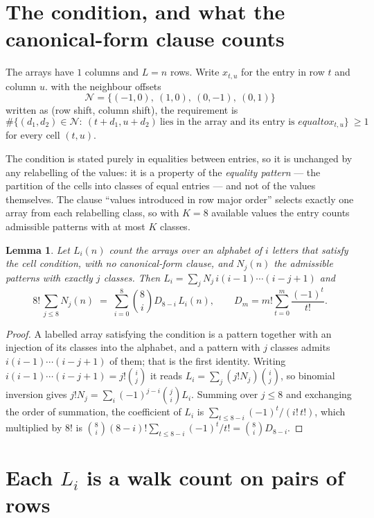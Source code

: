 \documentclass[11pt,a4paper]{article}
\theoremstyle{plain}
\newtheorem{lemma}[theorem]{Lemma}
\theoremstyle{definition}
\begin{document}
\section{The condition, and what the canonical-form clause counts}

The arrays have $1$ columns and $L=n$ rows. Write $x_{t,u}$ for the entry in
row $t$ and column $u$. with the neighbour offsets
\[
\mathcal N=\{(-1,0),\ (1,0),\ (0,-1),\ (0,1)\}
\]
written as (row shift, column shift), the requirement is
\begin{equation}\label{eq:loc}
\#\bigl\{(d_1,d_2)\in\mathcal N:\ (t+d_1,u+d_2)\ \text{lies in the array and its entry is }
equal to x_{t,u}\bigr\}\ \ge1
\end{equation}
for every cell $(t,u)$.

The condition is stated purely in equalities between entries, so it is unchanged by any
relabelling of the values: it is a property of the \emph{equality pattern} --- the partition
of the cells into classes of equal entries --- and not of the values themselves. The clause
``values introduced in row major order'' selects exactly one array from each relabelling
class, so with $K=8$ available values the entry counts admissible patterns with at most $K$
classes.

\begin{lemma}\label{lem:inv}
Let $L_i(n)$ count the arrays over an alphabet of $i$ letters that satisfy the cell
condition, with no canonical-form clause, and $N_j(n)$ the admissible patterns with exactly
$j$ classes. Then $L_i=\sum_j N_j\,i(i-1)\cdots(i-j+1)$ and
\[
8!\,\sum_{j\le 8}N_j(n)\;=\;\sum_{i=0}^{8}\binom{8}{i}D_{8-i}\,L_i(n),
\qquad D_m=m!\sum_{t=0}^{m}\frac{(-1)^t}{t!} .
\]
\end{lemma}

\begin{proof}
A labelled array satisfying the condition is a pattern together with an injection of its
classes into the alphabet, and a pattern with $j$ classes admits $i(i-1)\cdots(i-j+1)$ of
them; that is the first identity. Writing $i(i-1)\cdots(i-j+1)=j!\binom{i}{j}$ it reads
$L_i=\sum_j(j!N_j)\binom{i}{j}$, so binomial inversion gives
$j!N_j=\sum_i(-1)^{j-i}\binom{j}{i}L_i$. Summing over $j\le8$ and exchanging the
order of summation, the coefficient of $L_i$ is
$\sum_{t\le8-i}(-1)^t/(i!\,t!)$, which multiplied by $8!$ is
$\binom{8}{i}(8-i)!\sum_{t\le8-i}(-1)^t/t!=\binom{8}{i}D_{8-i}$.
\end{proof}

\section{Each $L_i$ is a walk count on pairs of rows}
\end{document}
